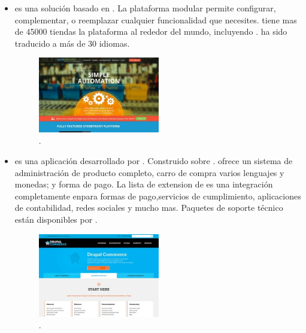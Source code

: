 \begin{itemize}
	\item \textbf{\nameSpreeCommerce} es una solución \ecommerce \openSourcePC  basado en \rubyonrailsNAME. La plataforma modular permite configurar, complementar, o reemplazar cualquier funcionalidad que necesites. \nameSpreeCommerce tiene mas de 45000 tiendas la plataforma al rededor del mundo, incluyendo \chipotle \cite{online_Chipotle}. \nameSpreeCommerce ha sido traducido a más de 30 idiomas.

	\begin{figure}[H]
		\centering
		\includegraphics[width=0.5\textwidth]{figuras/cap1/SpreeCommerceWebsite.jpg}
		\caption{\nameSpreeCommerce \websiteINT \cite{online_SpreeCommerce}.}
	\end{figure}

	\item \textbf{\nameDrupalCommerce} es una aplicación \ecommerce desarrollado por \commerceGuys. Construido sobre \drupalContManSys. \nameDrupalCommerce ofrece un sistema de administración de producto completo, carro de compra varios lenguajes y monedas; y forma de pago. La lista de extension de \nameDrupalCommerce es una integración completamente en\thirdParty para formas de pago,servicios de cumplimiento, aplicaciones de contabilidad, redes sociales y mucho mas. Paquetes de soporte técnico están disponibles por \commerceGuys.

	\begin{figure}[H]
		\centering
		\includegraphics[width=0.5\textwidth]{figuras/cap1/DrupalCommerceWebsite.jpg}
		\caption{\nameDrupalCommerce \websiteINT \cite{online_DrupalCommerce}.}
	\end{figure}


\end{itemize}
